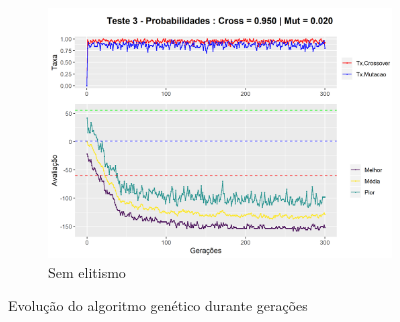 \begin{figure}[h!]
\begin{subfigure}[b]{0.47\linewidth}
		\includegraphics[width=\linewidth]{imagens/graph_pc_0_950_pm_0_020_pop_50_g_300__3_noelite.png}
		\caption{Sem elitismo}
	\end{subfigure}
	\caption{Evolução do algoritmo genético durante gerações}
	\label{fig:evolucaoGA2}
\end{figure}
\clearpage



